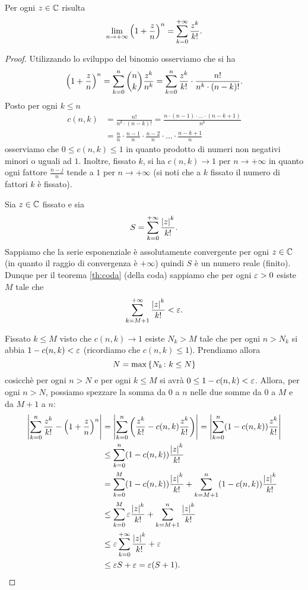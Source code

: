 \begin{theorem}%
\label{th:limite_notevole_esponenziale_complesso}%
\mymark{*}%
Per ogni $z\in {\mathbb C}$ risulta
\[
  \lim_{n \to +\infty} {\left( 1+\frac z n \right)}^n  
  = \sum_{k=0}^{+\infty} \frac{z^k}{k!}.
\]
\end{theorem}
%
\begin{proof}
\mymark{*}
Utilizzando lo sviluppo del binomio osserviamo che si ha
\[
 {\left( 1+\frac z n \right)}^n
 = \sum_{k=0}^n \binom{n}{k} \frac{z^k}{n^k}
 = \sum_{k=0}^n \frac{z^k}{k!} \cdot \frac{n!}{n^k\cdot (n-k)!}.
\]
Posto per ogni $k\le n$
\begin{align*}
 c(n,k)
  &= \frac{n!}{n^k\cdot (n-k)!}
  = \frac{n \cdot (n-1) \cdot \ldots \cdot(n-k+1)}{n^k} \\
  &= \frac{n}{n}\cdot {\frac {n-1} n} \cdot \frac {n-2} {n} \cdot \ldots \cdot \frac{n-k+1}{n}
\end{align*}
osserviamo che $0\le c(n,k)\le 1$ in quanto
prodotto di numeri non negativi minori o uguali ad $1$.
Inoltre, fissato $k$, si ha $c(n,k)  \to 1$ per $n\to +\infty$
in quanto ogni fattore $\frac{n-j}{n}$ tende
a $1$ per $n\to +\infty$ (si noti che a $k$ fissato il numero di fattori $k$ è
fissato).


Sia $z\in {\mathbb C}$ fissato e sia
\[
  S = \sum_{k=0}^{+\infty} \frac{{\left|z\right|}^k}{k!}.
\]
Sappiamo che la serie esponenziale è assolutamente convergente
per ogni $z\in {\mathbb C}$ (in quanto il raggio di convergenza è $+\infty$)
quindi $S$ è un numero reale (finito).
Dunque per il teorema \ref{th:coda} (della coda) sappiamo che per ogni $\varepsilon>0$
esiste $M$ tale che
\[
   \sum_{k=M+1}^{+\infty} \frac{{\left|z\right|}^k}{k!} < \varepsilon.
\]

Fissato $k\le M$ visto che $c(n,k)\to 1$
esiste $N_k > M$ tale che per ogni $n>N_k$
si abbia $1-c(n,k) < \varepsilon$
(ricordiamo che $c(n,k)\le 1$).
Prendiamo allora
\[
  N=\max{\left\{ N_k\colon k\le N \right\}}
\]
cosicchè per ogni $n>N$ e per ogni $k\le M$ si avrà $0 \le 1-c(n,k) < \varepsilon$.
Allora, per ogni $n>N$, possiamo spezzare la somma da $0$ a $n$ nelle due
somme da $0$ a $M$ e da $M+1$ a $n$:
\begin{align*}
{\left|\sum_{k=0}^n \frac{z^k}{k!} - {\left( 1+\frac z n \right)}^n\right|}
&= {\left|\sum_{k=0}^n {\left( \frac{z^k}{k!} - c(n,k)\frac{z^k}{k!} \right)}\right|}
= {\left|\sum_{k=0}^n  (1-c(n,k))\frac{z^k}{k!}\right|} \\
&\le \sum_{k=0}^n  (1-c(n,k))\frac{{\left|z\right|}^k}{k!} \\
  &= \sum_{k=0}^{M} (1-c(n,k)) \frac{{\left|z\right|}^k}{k!}
   + \sum_{k=M+1}^n (1-c(n,k)) \frac{{\left|z\right|}^k}{k!} \\
&\le \sum_{k=0}^{M} \varepsilon \frac{{\left|z\right|}^k}{k!}
   + \sum_{k=M+1}^n \frac{{\left|z\right|}^k}{k!} \\
&\le  \varepsilon \sum_{k=0}^{+\infty} \frac{{\left|z\right|}^k}{k!}
    + \varepsilon \\
&\le \varepsilon S + \varepsilon
= \varepsilon (S+1).
\end{align*}


\end{proof}
